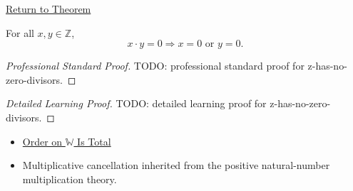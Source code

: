 \newpage
{}
\label{prf:z-has-no-zero-divisors}

\begin{remark*}[Return]
\hyperref[thm:z-has-no-zero-divisors]{Return to Theorem}
\end{remark*}

\begin{theorem*}
For all $x,y\in\mathbb{Z}$,
\[
x\cdot y=0 \Longrightarrow x=0 \text{ or } y=0.
\]
\end{theorem*}

\begin{proof}[Professional Standard Proof]
\LRAProofBodyStart
TODO: professional standard proof for z-has-no-zero-divisors.
\end{proof}

\begin{proof}[Detailed Learning Proof]
\LRAProofBodyStart
TODO: detailed learning proof for z-has-no-zero-divisors.
\end{proof}

\begin{remark*}
\end{remark*}

\begin{dependencies}
\begin{itemize}
  \item \hyperref[thm:order-on-w-total]{Order on $\mathbb{W}$ Is Total}
  \item Multiplicative cancellation inherited from the positive natural-number multiplication theory.
\end{itemize}
\end{dependencies}

\clearpage
